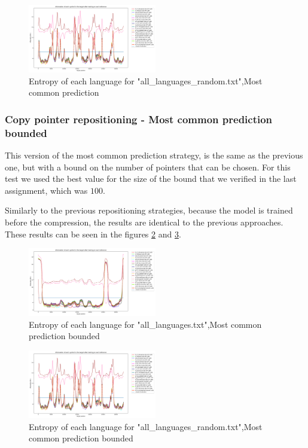 \documentclass{article}
\begin{document}
\begin{figure}
    \centering
    \includegraphics[width=0.5\textwidth]{../results/all_languages_random/-r_m.png}
    \caption{Entropy of each language for "all_languages_random.txt",Most common prediction}
    \label{fig:all_languages_random_r_m}
\end{figure}

\subsubsection{Copy pointer repositioning - Most common prediction bounded}
\label{subsubsec:results_locate_lang_most_common_prediction_bounded}

This version of the most common prediction strategy, is the same as the previous one, but with a bound on the number of pointers that can be chosen.
For this test we used the best value for the size of the bound that we verified in the last assignment, which was $100$.

Similarly to the previous repositioning strategies, because the model is trained before the compression, the results are identical to the previous approaches.
These results can be seen in the figures \ref{fig:all_languages_r_c} and \ref{fig:all_languages_random_r_c}.

\begin{figure}
    \centering
    \includegraphics[width=0.5\textwidth]{../results/all_languages/-r_c:100.png}
    \caption{Entropy of each language for "all_languages.txt",Most common prediction bounded}
    \label{fig:all_languages_r_c}
\end{figure}

\begin{figure}
    \centering
    \includegraphics[width=0.5\textwidth]{../results/all_languages_random/-r_c:100.png}
    \caption{Entropy of each language for "all_languages_random.txt",Most common prediction bounded}
    \label{fig:all_languages_random_r_c}
\end{figure}
\end{document}
